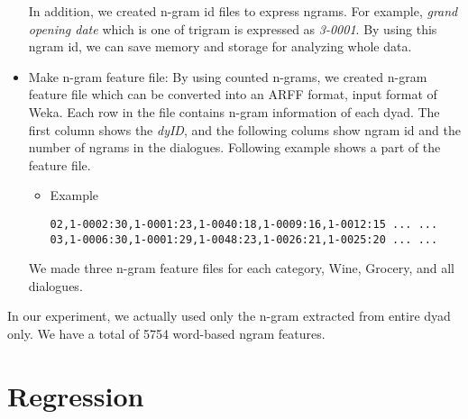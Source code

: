 \documentclass[11pt]{article} %
\begin{document}
\begin{itemize}
In addition, we created n-gram id files to express ngrams. For example, \textit{grand opening date} which is one of trigram is expressed as \textit{3-0001}. By using this ngram id, we can save memory and storage for analyzing whole data.
\item Make n-gram feature file:\newline
By using counted n-grams, we created n-gram feature file which can be converted into an ARFF format, input format of Weka. Each row in the file contains n-gram information of each dyad. The first column shows the \textit{dyID}, and the following colums show ngram id and the number of ngrams in the dialogues. Following example shows a part of the feature file.
\begin{itemize}
\item Example
\begin{verbatim}
02,1-0002:30,1-0001:23,1-0040:18,1-0009:16,1-0012:15 ... ...
03,1-0006:30,1-0001:29,1-0048:23,1-0026:21,1-0025:20 ... ...
\end{verbatim}
\end{itemize}
We made three n-gram feature files for each category, Wine, Grocery, and all dialogues.
\end{itemize}

In our experiment, we actually used only the n-gram extracted from entire dyad only. We have a total of 5754 word-based ngram features.

\section{Regression}
\end{document}
